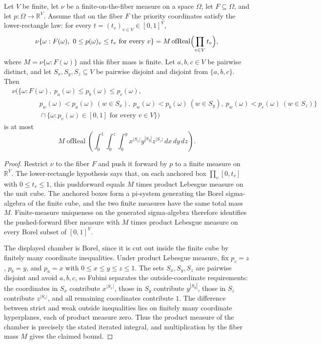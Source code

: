 \begin{helper}
Let \(V\) be finite, let \(\nu\) be a finite-on-the-fiber measure on a space
\(\Omega\), let \(F\subseteq\Omega\), and let \(p:\Omega\to\mathbb R^V\).
Assume that on the fiber \(F\) the priority coordinates satisfy the
lower-rectangle law: for every \(t=(t_v)_{v\in V}\in[0,1]^V\),
\[
\nu\{\omega:F(\omega),\ 0\le p(\omega)_v\le t_v\text{ for every }v\}
=M\operatorname{ofReal}\Bigl(\prod_{v\in V}t_v\Bigr),
\]
where \(M=\nu\{\omega:F(\omega)\}\) and this fiber mass is finite.  Let
\(a,b,c\in V\) be pairwise distinct, and let \(S_x,S_y,S_z\subseteq V\) be
pairwise disjoint and disjoint from \(\{a,b,c\}\).  Then
\[
\begin{aligned}
&\nu\bigl(\{\omega:F(\omega),\ p_a(\omega)\le p_b(\omega)\le p_c(\omega),\\
&\qquad\qquad
  p_w(\omega)<p_a(\omega)\ (w\in S_x),\
  p_w(\omega)<p_b(\omega)\ (w\in S_y),\
  p_w(\omega)<p_c(\omega)\ (w\in S_z)\}\\
&\qquad\qquad\cap\{\omega:p_v(\omega)\in[0,1]\text{ for every }v\in V\}\bigr)
\end{aligned}
\]
is at most
\[
M\operatorname{ofReal}\left(
\int_0^1\int_0^z\int_0^y
x^{|S_x|}y^{|S_y|}z^{|S_z|}\,dx\,dy\,dz\right).
\]
\end{helper}
\begin{proof}
Restrict \(\nu\) to the fiber \(F\) and push it forward by \(p\) to a finite
measure on \(\mathbb R^V\).  The lower-rectangle hypothesis says that, on each
anchored box \(\prod_v[0,t_v]\) with \(0\le t_v\le1\), this pushforward equals
\(M\) times product Lebesgue measure on the unit cube.  The anchored boxes form
a pi-system generating the Borel sigma-algebra of the finite cube, and the two
finite measures have the same total mass \(M\).  Finite-measure uniqueness on
the generated sigma-algebra therefore identifies the pushed-forward fiber
measure with \(M\) times product Lebesgue measure on every Borel subset of
\([0,1]^V\).

The displayed chamber is Borel, since it is cut out inside the finite cube by
finitely many coordinate inequalities.  Under product Lebesgue measure, fix
\(p_c=z\), \(p_b=y\), and \(p_a=x\) with \(0\le x\le y\le z\le1\).  The sets
\(S_x,S_y,S_z\) are pairwise disjoint and avoid \(a,b,c\), so Fubini separates
the outside-coordinate requirements: the coordinates in \(S_x\) contribute
\(x^{|S_x|}\), those in \(S_y\) contribute \(y^{|S_y|}\), those in \(S_z\)
contribute \(z^{|S_z|}\), and all remaining coordinates contribute \(1\).
The difference between strict and weak outside inequalities lies on finitely
many coordinate hyperplanes, each of product measure zero.  Thus the product
measure of the chamber is precisely the stated iterated integral, and
multiplication by the fiber mass \(M\) gives the claimed bound.
\end{proof}
